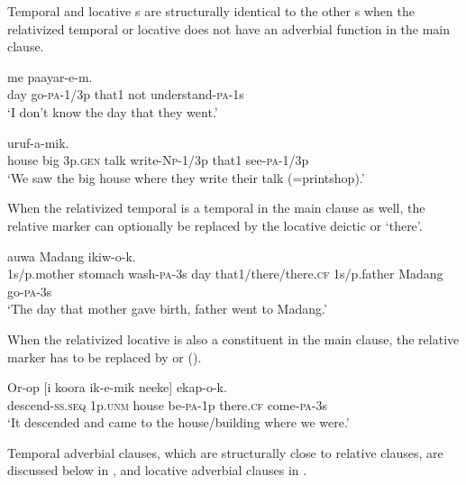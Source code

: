 Temporal and locative s are structurally identical to the other s when the relativized temporal or locative  does not have an adverbial function in the main clause. 

\ea%
\label{ex:x1554}
  me  paayar-e-m. \\
day  go-\textsc{pa}-1/3p  that1  not  understand-\textsc{pa}-1s\\
\glt`I don't know the day that they went.'
\z


\ea%
\label{ex:x1560}
  uruf-a-mik. \\
house  big  3p.\textsc{gen} talk  write-\textsc{Np}-1/3p that1  see-\textsc{pa}-1/3p\\
\glt`We saw the big house where they write their talk (=printshop).'
\z


When the relativized temporal  is a temporal in the main clause as well, the relative marker can optionally be replaced by the locative deictic  or  `there'.

\ea%
\label{ex:x1625}
 auwa  Madang  ikiw-o-k.\\
1s/p.mother  stomach  wash-\textsc{pa}-3s day that1/there/there.\textsc{cf} 1s/p.father Madang go-\textsc{pa}-3s\\
\glt`The day that mother gave birth, father went to Madang.'
\z


When the relativized locative  is also a constituent in the main clause, the relative marker has to be replaced by  or  ().

\ea%
\label{ex:x1622}
\gll Or-op  [i  koora  ik-e-mik  neeke]  ekap-o-k.\\
descend-\textsc{ss}.\textsc{seq} 1p.\textsc{unm} house be-\textsc{pa}-1p there.\textsc{cf} come-\textsc{pa}-3s\\
\glt`It descended and came to the house/building where we were.'
\z


Temporal adverbial clauses, which are structurally close to relative clauses, are discussed below in , and locative adverbial clauses in .

